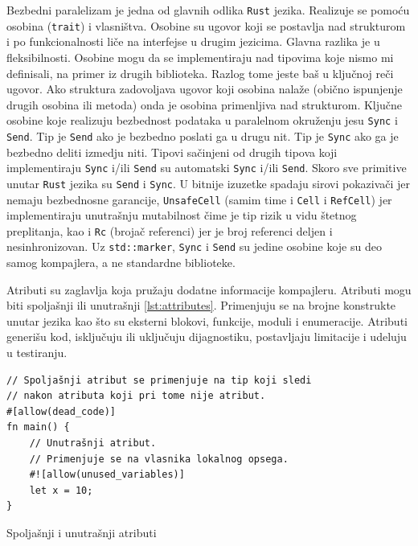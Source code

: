 Bezbedni paralelizam je jedna od glavnih odlika \verb|Rust| jezika. Realizuje se pomoću osobina (\verb|trait|)
i vlasništva. Osobine su ugovor koji se postavlja nad strukturom i po funkcionalnosti liče na interfejse
u drugim jezicima. Glavna razlika je u fleksibilnosti. Osobine mogu da se implementiraju nad tipovima
koje nismo mi definisali, na primer iz drugih biblioteka. Razlog tome jeste baš u ključnoj reči ugovor.
Ako struktura zadovoljava ugovor koji osobina nalaže (obično ispunjenje drugih osobina ili
metoda) onda je osobina primenljiva nad strukturom. Ključne osobine koje realizuju bezbednost podataka
u paralelnom okruženju jesu \verb|Sync| i \verb|Send|. Tip je \verb|Send| ako je bezbedno poslati ga 
u drugu nit. Tip je \verb|Sync| ako ga je bezbedno deliti izmedju niti. Tipovi sačinjeni od drugih tipova koji
implementiraju \verb|Sync| i/ili \verb|Send| su automatski \verb|Sync| i/ili \verb|Send|. Skoro sve primitive
unutar \verb|Rust| jezika su \verb|Send| i \verb|Sync|. U bitnije izuzetke spadaju sirovi pokazivači jer nemaju
bezbednosne garancije, \verb|UnsafeCell| (samim time i \verb|Cell| i \verb|RefCell|) jer implementiraju
unutrašnju mutabilnost čime je tip rizik u vidu štetnog preplitanja, kao i \verb|Rc| (brojač referenci) 
jer je broj referenci deljen i nesinhronizovan. Uz \verb|std::marker|, \verb|Sync| i \verb|Send| su jedine osobine koje su 
deo samog kompajlera, a ne standardne biblioteke.

Atributi su zaglavlja koja pružaju dodatne informacije kompajleru. Atributi mogu biti spoljašnji ili 
unutrašnji \ref{lst:attributes}. Primenjuju se na brojne konstrukte unutar jezika kao što su eksterni blokovi,
funkcije, moduli i enumeracije. Atributi generišu kod, isključuju ili uključuju dijagnostiku, 
postavljaju limitacije i udeluju u testiranju. 

\begin{listing}[H]
\begin{verbatim}
// Spoljašnji atribut se primenjuje na tip koji sledi 
// nakon atributa koji pri tome nije atribut.
#[allow(dead_code)] 
fn main() {
    // Unutrašnji atribut.
    // Primenjuje se na vlasnika lokalnog opsega. 
    #![allow(unused_variables)]
    let x = 10;  
}
\end{verbatim}
\caption{Spoljašnji i unutrašnji atributi}
\label{lst:attributes}
\end{listing}

